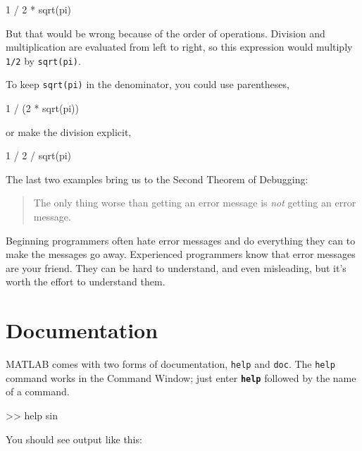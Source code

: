 \begin{code}
1 / 2 * sqrt(pi)
\end{code}

But that would be wrong because of the order of operations.  Division and multiplication are evaluated from left to right, so this expression would multiply \lstinline{1/2} by \lstinline{sqrt(pi)}.


To keep \lstinline{sqrt(pi)} in the denominator, you could use parentheses,

\begin{code}
1 / (2 * sqrt(pi))
\end{code}
or make the division explicit,

\begin{code}
1 / 2 / sqrt(pi)
\end{code}


The last two examples bring us to the Second Theorem of Debugging:

\begin{quote}
The only thing worse than getting an error message is \emph{not} getting an error message.
\end{quote}

Beginning programmers often hate error messages and do everything they
can to make the messages go away.  Experienced programmers know that error
messages are your friend.  They can be hard to understand, and even
misleading, but it's worth the effort to understand them.

\section{Documentation}

MATLAB comes with two forms of documentation, \lstinline{help}
and \lstinline{doc}.
The \lstinline{help} command works in the Command Window; just
enter \textbf{\lstinline{help}} followed by the name of a command.


\begin{code}
>> help sin
\end{code}

You should see output like this:

